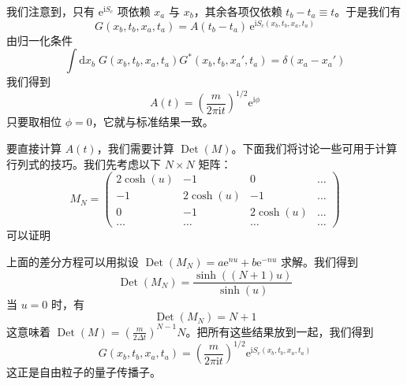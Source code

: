我们注意到，只有 $\mathrm{e}^{\mathrm{i}S_c}$ 项依赖 $x_a$ 与 $x_b$，其余各项仅依赖 $t_b - t_a \equiv t$。于是我们有
\begin{equation*}
G(x_b,t_b,x_a,t_a) = A(t_b-t_a)\,\mathrm{e}^{\mathrm{i}S_c(x_b,t_b,x_a,t_a)} \tag{2.1.18}
\end{equation*}
由归一化条件
\begin{equation*}
\int \mathrm{d}x_b\; G(x_b,t_b,x_a,t_a)G^*(x_b,t_b,x_a',t_a) = \delta(x_a-x_a')
\end{equation*}
我们得到
\begin{equation*}
A(t) = \left(\frac{m}{2\pi\mathrm{i}t}\right)^{1/2}\mathrm{e}^{\mathrm{i}\phi}
\end{equation*}
只要取相位 $\phi = 0$，它就与标准结果一致。

要直接计算 $A(t)$，我们需要计算 $\operatorname{Det}(M)$。下面我们将讨论一些可用于计算行列式的技巧。我们先考虑以下 $N\times N$ 矩阵：
\begin{equation*}
M_N = \left(\begin{array}{cccc} 2\cosh(u) & -1 & 0 & \dots\\ -1 & 2\cosh(u) & -1 & \dots\\ 0 & -1 & 2\cosh(u) & \dots\\ \dots & \dots & \dots & \dots \end{array}\right)
\end{equation*}
可以证明


上面的差分方程可以用拟设 $\operatorname{Det}(M_N)=a\mathrm{e}^{nu}+b\mathrm{e}^{-nu}$ 求解。我们得到
\begin{equation*}
\operatorname{Det}(M_N)=\frac{\sinh((N+1)u)}{\sinh(u)}
\end{equation*}
当 $u=0$ 时，有
\begin{equation*}
\operatorname{Det}(M_N)=N+1
\end{equation*}
这意味着 $\operatorname{Det}(M)=\left(\frac{m}{2\Delta t}\right)^{N-1}N$。把所有这些结果放到一起，我们得到
\begin{equation*}
G(x_b,t_b,x_a,t_a)=\left(\frac{m}{2\pi\mathrm{i}t}\right)^{1/2}\mathrm{e}^{\mathrm{i}S_c(x_b,t_b,x_a,t_a)}
\end{equation*}
这正是自由粒子的量子传播子。

